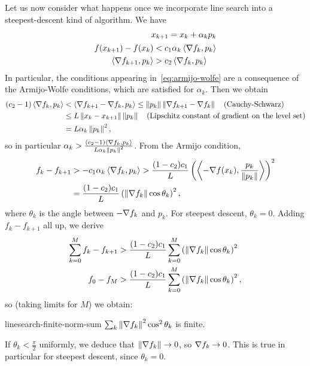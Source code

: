 Let us now consider what happens once we incorporate line search into a
steepest-descent kind of algorithm. We have
\begin{align}
	x_{k+1} = x_k + \alpha_k p_k \nonumber \\
	\begin{aligned}
	f(x_{k+1}) - f(x_k) &< c_1 \alpha_k \left\langle \nabla f_k, p_k \right\rangle \\
	\left\langle \nabla f_{k+1}, p_k \right\rangle &> c_2 \left\langle \nabla f_k, p_k \right\rangle
	\end{aligned} \label{eq:armijo-wolfe}
\end{align}
In particular, the conditions appearing in~\cref{eq:armijo-wolfe} are a consequence
of the Armijo-Wolfe conditions, which are satisfied for $\alpha_k$. Then we obtain
\begin{align*}
	(c_2 - 1) \left\langle \nabla f_k, p_k \right\rangle &< \left\langle \nabla f_{k+1} - \nabla f_k, p_k \right\rangle
	\leq \left \| p_k \right \| \left \| \nabla f_{k+1} - \nabla f_k \right \| \quad
	(\text{Cauchy-Schwarz}) \\
		&\leq L \left \| x_k - x_{k+1} \right \| \left \| p_k \right \| \quad (\text{Lipschitz constant
		of gradient on the level set}) \\
		&= L \alpha_k \left \| p_k \right \|^2,
\end{align*}
so in particular $\alpha_k > \frac{(c_2 - 1) \left\langle \nabla f_k, p_k \right\rangle}{L \alpha_k
\left \| p_k \right \|^2}$. From the Armijo condition,
\begin{align*}
	f_k - f_{k+1} &> -c_1 \alpha_k \left\langle \nabla f_k, p_k \right\rangle
	> \frac{(1 - c_2) c_1}{L} \left( \left\langle -\nabla f(x_k),
	\frac{p_k}{\left \| p_k \right \|} \right\rangle \right)^2 \\
				  &= \frac{(1 - c_2) c_1}{L}
				  	 \left( \left \| \nabla f_k \right \| \cos \theta_k \right)^2,
\end{align*}
where $\theta_k$ is the angle between $-\nabla f_k$ and $p_k$. For steepest
descent, $\theta_k = 0$. Adding $f_k - f_{k+1}$ all up, we derive
\begin{align*}
	\sum_{k=0}^{M} f_k - f_{k+1} &> \frac{(1 - c_2) c_1}{L}
	\sum_{k=0}^M \left( \left \| \nabla f_k \right \| \cos \theta_k \right)^2 \\
	f_0 - f_M &> \frac{(1 - c_2) c_1}{L} \sum_{k=0}^M
		\left( \left \| \nabla f_k \right \| \cos \theta_k \right)^2,
\end{align*}
so (taking limits for $M$) we obtain:
\begin{ctheorem}{\cite{Zout60}}{linesearch-finite-norm-sum}
	$\sum_k \left \| \nabla f_k \right \|^2 \cos^2 \theta_k$ is finite.
\end{ctheorem}

\begin{corollary}
	If $\theta_k < \frac{\pi}{2}$ uniformly, we deduce that $\left \| \nabla f_k \right \|
	\to 0$, so $\nabla f_k \to 0$. This is true in particular for steepest
	descent, since $\theta_k = 0$.
\end{corollary}
